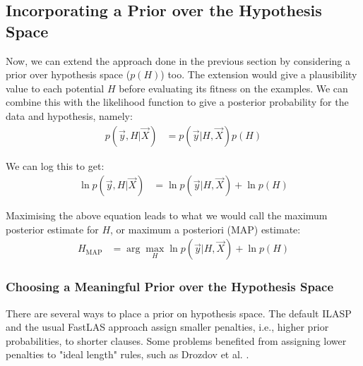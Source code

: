 \subsection{Incorporating a Prior over the Hypothesis Space}

Now, we can extend the approach done in the previous section by considering a prior over hypothesis space ($p(H)$) too.
The extension would give a plausibility value to each potential $H$ before evaluating its fitness on the examples. 
We can combine this with the likelihood function to give a posterior probability for the data and hypothesis, namely:
\begin{align}
p(\vec{y}, H|\vec{X})
& = p(\vec{y}|H, \vec{X})p(H)
\end{align}

We can log this to get:
\begin{align}
\ln p(\vec{y}, H|\vec{X})
& = \ln p(\vec{y}|H, \vec{X}) + \ln p(H)
\end{align}

Maximising the above equation leads to what we would call the maximum posterior estimate for $H$, or maximum a posteriori (MAP) estimate:
\begin{align}
H_{\text{MAP}}
& = \arg\max_{H} \ln p(\vec{y}|H, \vec{X}) + \ln p(H) 
\end{align}




\subsubsection{Choosing a Meaningful Prior over the Hypothesis Space}

There are several ways to place a prior on hypothesis space. 
The default ILASP \cite{RefWorks:RefID:18-law2020ilasp} and the usual FastLAS approach assign smaller penalties, i.e., higher prior probabilities, to shorter clauses.
Some problems benefited from assigning lower penalties to "ideal length" rules, such as Drozdov et al. \cite{RefWorks:RefID:67-drozdov2021online}.

